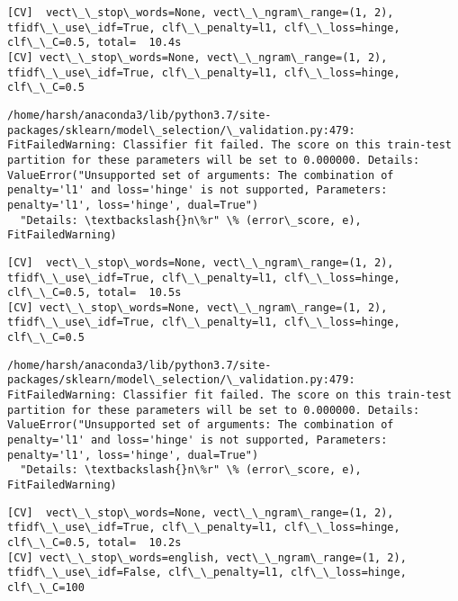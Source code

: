 \documentclass[11pt]{article}
\begin{document}
    \begin{Verbatim}[commandchars=\\\{\}]
[CV]  vect\_\_stop\_words=None, vect\_\_ngram\_range=(1, 2), tfidf\_\_use\_idf=True, clf\_\_penalty=l1, clf\_\_loss=hinge, clf\_\_C=0.5, total=  10.4s
[CV] vect\_\_stop\_words=None, vect\_\_ngram\_range=(1, 2), tfidf\_\_use\_idf=True, clf\_\_penalty=l1, clf\_\_loss=hinge, clf\_\_C=0.5 

    \end{Verbatim}

    \begin{Verbatim}[commandchars=\\\{\}]
/home/harsh/anaconda3/lib/python3.7/site-packages/sklearn/model\_selection/\_validation.py:479: FitFailedWarning: Classifier fit failed. The score on this train-test partition for these parameters will be set to 0.000000. Details: 
ValueError("Unsupported set of arguments: The combination of penalty='l1' and loss='hinge' is not supported, Parameters: penalty='l1', loss='hinge', dual=True")
  "Details: \textbackslash{}n\%r" \% (error\_score, e), FitFailedWarning)

    \end{Verbatim}

    \begin{Verbatim}[commandchars=\\\{\}]
[CV]  vect\_\_stop\_words=None, vect\_\_ngram\_range=(1, 2), tfidf\_\_use\_idf=True, clf\_\_penalty=l1, clf\_\_loss=hinge, clf\_\_C=0.5, total=  10.5s
[CV] vect\_\_stop\_words=None, vect\_\_ngram\_range=(1, 2), tfidf\_\_use\_idf=True, clf\_\_penalty=l1, clf\_\_loss=hinge, clf\_\_C=0.5 

    \end{Verbatim}

    \begin{Verbatim}[commandchars=\\\{\}]
/home/harsh/anaconda3/lib/python3.7/site-packages/sklearn/model\_selection/\_validation.py:479: FitFailedWarning: Classifier fit failed. The score on this train-test partition for these parameters will be set to 0.000000. Details: 
ValueError("Unsupported set of arguments: The combination of penalty='l1' and loss='hinge' is not supported, Parameters: penalty='l1', loss='hinge', dual=True")
  "Details: \textbackslash{}n\%r" \% (error\_score, e), FitFailedWarning)

    \end{Verbatim}

    \begin{Verbatim}[commandchars=\\\{\}]
[CV]  vect\_\_stop\_words=None, vect\_\_ngram\_range=(1, 2), tfidf\_\_use\_idf=True, clf\_\_penalty=l1, clf\_\_loss=hinge, clf\_\_C=0.5, total=  10.2s
[CV] vect\_\_stop\_words=english, vect\_\_ngram\_range=(1, 2), tfidf\_\_use\_idf=False, clf\_\_penalty=l1, clf\_\_loss=hinge, clf\_\_C=100 

    \end{Verbatim}
\end{document}
